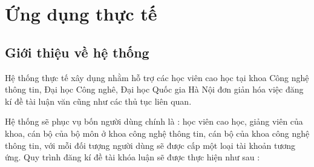 \chapter{Ứng dụng thực tế}
 
\section{Giới thiệu về hệ thống}
Hệ thống thực tế xây dụng nhằm hỗ trợ các học viên cao học tại khoa Công nghệ thông tin, Đại học Công nghê, Đại học Quốc gia Hà Nội đơn giản hóa việc đăng kí đề tài luận văn cũng như các thủ tục liên quan.

Hệ thống sẽ phục vụ bốn người dùng chính là : học viên cao học, giảng viên của khoa, cán bộ của bộ môn ở khoa công nghệ thông tin, cán bộ của khoa công nghệ thông tin, với mỗi đối tượng người dùng sẽ được cấp một loại tài khoản tương ứng.
Quy trình đăng kí đề tài khóa luận sẽ được thực hiện như sau : 

